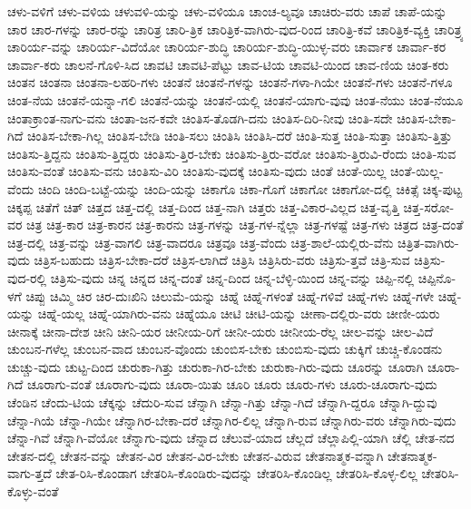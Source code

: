{ಚಳು-ವಳಿಗೆ
ಚಳು-ವಳಿಯ
ಚಳುವಳಿ-ಯನ್ನು
ಚಳು-ವಳಿಯೂ
ಚಾಂಚ-ಲ್ಯವೂ
ಚಾಚಿರು-ವರು
ಚಾಪೆ
ಚಾಪೆ-ಯನ್ನು
ಚಾರ
ಚಾರ-ಗಳನ್ನು
ಚಾರ-ರನ್ನು
ಚಾರಿತ್ರ
ಚಾರಿ-ತ್ರಿಕ
ಚಾರಿತ್ರಿಕ-ವಾಗಿರು-ವುದ-ರಿಂದ
ಚಾರಿತ್ರಿ-ಕವೆ
ಚಾರಿತ್ರಿಕ-ವ್ಯಕ್ತಿ
ಚಾರಿತ್ರ್ಯ
ಚಾರಿರ್ಯ-ವನ್ನು
ಚಾರಿರ್ಯ-ವಿದೆಯೋ
ಚಾರಿರ್ಯ-ಶುದ್ಧಿ
ಚಾರಿರ್ಯ-ಶುದ್ಧಿ-ಯುಳ್ಳ-ವರು
ಚಾರ್ವಾಕ
ಚಾರ್ವಾ-ಕರ
ಚಾರ್ವಾ-ಕರು
ಚಾಲನೆ-ಗೊಳಿ-ಸಿದ
ಚಾವಟಿ
ಚಾವಟಿ-ಪೆಟ್ಟು
ಚಾವ-ಟಿಯ
ಚಾವಟಿ-ಯಿಂದ
ಚಾವ-ಣಿಯ
ಚಿಂತ-ಕರು
ಚಿಂತನ
ಚಿಂತನಾ
ಚಿಂತನಾ-ಲಹರಿ-ಗಳು
ಚಿಂತನೆ
ಚಿಂತನೆ-ಗಳನ್ನು
ಚಿಂತನೆ-ಗಳಾ-ಗಿಯೇ
ಚಿಂತನೆ-ಗಳು
ಚಿಂತನೆ-ಗಳೂ
ಚಿಂತ-ನೆಯ
ಚಿಂತನೆ-ಯನ್ನಾ-ಗಲಿ
ಚಿಂತನೆ-ಯನ್ನು
ಚಿಂತನೆ-ಯಲ್ಲಿ
ಚಿಂತನೆ-ಯಾಗು-ವುವು
ಚಿಂತ-ನೆಯು
ಚಿಂತ-ನೆಯೂ
ಚಿಂತಾಕ್ರಾಂತ-ನಾಗು-ವನು
ಚಿಂತಾ-ಜನ-ಕವೇ
ಚಿಂತಿಸ-ತೊಡಗಿ-ದನು
ಚಿಂತಿಸ-ದಿರಿ-ನೀವು
ಚಿಂತಿ-ಸದೇ
ಚಿಂತಿಸ-ಬೇಕಾ-ಗಿದೆ
ಚಿಂತಿಸ-ಬೇಕಾ-ಗಿಲ್ಲ
ಚಿಂತಿಸ-ಬೇಡಿ
ಚಿಂತಿ-ಸಲು
ಚಿಂತಿಸಿ
ಚಿಂತಿಸಿ-ದರೆ
ಚಿಂತಿ-ಸುತ್ತ
ಚಿಂತಿ-ಸುತ್ತಾ
ಚಿಂತಿಸು-ತ್ತಿತ್ತು
ಚಿಂತಿಸು-ತ್ತಿದ್ದನು
ಚಿಂತಿಸು-ತ್ತಿದ್ದರು
ಚಿಂತಿಸು-ತ್ತಿರ-ಬೇಕು
ಚಿಂತಿಸು-ತ್ತಿರು-ವರೋ
ಚಿಂತಿಸು-ತ್ತಿರುವಿ-ರೆಂದು
ಚಿಂತಿ-ಸುವ
ಚಿಂತಿಸು-ವಂತೆ
ಚಿಂತಿಸು-ವನು
ಚಿಂತಿಸು-ವಿರಿ
ಚಿಂತಿಸು-ವುದಕ್ಕೆ
ಚಿಂತಿಸು-ವುದು
ಚಿಂತೆ
ಚಿಂತೆ-ಯಿಲ್ಲ
ಚಿಂತೆ-ಯಿಲ್ಲ-ವೆಂದು
ಚಿಂದಿ
ಚಿಂದಿ-ಬಟ್ಟೆ-ಯನ್ನು
ಚಿಂದಿ-ಯನ್ನು
ಚಿಕಾಗೊ
ಚಿಕಾ-ಗೊಗೆ
ಚಿಕಾಗೋ
ಚಿಕಾಗೋ-ದಲ್ಲಿ
ಚಿಕಿತ್ಸೆ
ಚಿಕ್ಕ-ಪುಟ್ಟ
ಚಿಕ್ಕಪ್ಪ
ಚಿತೆಗೆ
ಚಿತ್
ಚಿತ್ತದ
ಚಿತ್ತ-ದಲ್ಲಿ
ಚಿತ್ತ-ದಿಂದ
ಚಿತ್ತ-ನಾಗಿ
ಚಿತ್ತರು
ಚಿತ್ತ-ವಿಕಾರ-ವಿಲ್ಲದ
ಚಿತ್ತ-ವೃತ್ತಿ
ಚಿತ್ತ-ಸರೋ-ವರ
ಚಿತ್ರ
ಚಿತ್ರ-ಕಾರ
ಚಿತ್ರ-ಕಾರನ
ಚಿತ್ರ-ಕಾರನು
ಚಿತ್ರ-ಗಳನ್ನು
ಚಿತ್ರ-ಗಳ-ನ್ನೆಲ್ಲಾ
ಚಿತ್ರ-ಗಳಷ್ಟೆ
ಚಿತ್ರ-ಗಳು
ಚಿತ್ರದ
ಚಿತ್ರ-ದಂತೆ
ಚಿತ್ರ-ದಲ್ಲಿ
ಚಿತ್ರ-ವನ್ನು
ಚಿತ್ರ-ವಾಗಲಿ
ಚಿತ್ರ-ವಾದರೂ
ಚಿತ್ರವೂ
ಚಿತ್ರ-ವೆಂದು
ಚಿತ್ರ-ಶಾಲೆ-ಯಲ್ಲಿರು-ವೆನು
ಚಿತ್ರಿತ-ವಾಗಿರು-ವುದು
ಚಿತ್ರಿಸ-ಬಹುದು
ಚಿತ್ರಿಸ-ಬೇಕಾ-ದರೆ
ಚಿತ್ರಿಸ-ಲಾಗಿದೆ
ಚಿತ್ರಿಸಿ
ಚಿತ್ರಿಸಿರು-ವರು
ಚಿತ್ರಿಸು-ತ್ತವೆ
ಚಿತ್ರಿ-ಸುವ
ಚಿತ್ರಿಸು-ವುದ-ರಲ್ಲಿ
ಚಿತ್ರಿಸು-ವುದು
ಚಿನ್ನ
ಚಿನ್ನದ
ಚಿನ್ನ-ದಂತೆ
ಚಿನ್ನ-ದಿಂದ
ಚಿನ್ನ-ಬೆಳ್ಳಿ-ಯಿಂದ
ಚಿನ್ನ-ವನ್ನು
ಚಿಪ್ಪಿ-ನಲ್ಲಿ
ಚಿಪ್ಪಿನೊ-ಳಗೆ
ಚಿಪ್ಪು
ಚಿಮ್ಮಿ
ಚಿರ
ಚಿರ-ದುಃಖಿನಿ
ಚಿಲುಮೆ-ಯನ್ನು
ಚಿಹ್ನೆ
ಚಿಹ್ನೆ-ಗಳಂತೆ
ಚಿಹ್ನೆ-ಗಳಿವೆ
ಚಿಹ್ನೆ-ಗಳು
ಚಿಹ್ನೆ-ಗಳೇ
ಚಿಹ್ನೆ-ಯನ್ನು
ಚಿಹ್ನೆ-ಯಲ್ಲ
ಚಿಹ್ನೆ-ಯಾಗಿರು-ವನು
ಚಿಹ್ನೆಯೂ
ಚೀಟಿ
ಚೀಟಿ-ಯನ್ನು
ಚೀಣಾ-ದಲ್ಲಿರು-ವರು
ಚೀಣೀ-ಯರು
ಚೀನಾಕ್ಕೆ
ಚೀನಾ-ದೇಶ
ಚೀನಿ
ಚೀನಿ-ಯರ
ಚೀನೀಯ-ರಿಗೆ
ಚೀನೀ-ಯರು
ಚೀನೀಯ-ರೆಲ್ಲ
ಚೀಲ-ವನ್ನು
ಚೀಲ-ವಿದೆ
ಚುಂಬನ-ಗಳೆಲ್ಲ
ಚುಂಬನ-ವಾದ
ಚುಂಬನ-ವೊಂದು
ಚುಂಬಿಸ-ಬೇಕು
ಚುಂಬಿಸು-ವುದು
ಚುಕ್ಕಿಗೆ
ಚುಚ್ಚಿ-ಕೊಂಡನು
ಚುಚ್ಚು-ವುದು
ಚುಟ್ಟ-ದಿಂದ
ಚುರುಕಾ-ಗಿತ್ತು
ಚುರುಕಾ-ಗಿರ-ಬೇಕು
ಚುರುಕಾ-ಗಿರು-ವುದು
ಚೂರನ್ನು
ಚೂರಾಗಿ
ಚೂರಾ-ಗಿದೆ
ಚೂರಾಗು-ವಂತೆ
ಚೂರಾಗು-ವುದು
ಚೂರಾ-ಯಿತು
ಚೂರಿ
ಚೂರು
ಚೂರು-ಗಳು
ಚೂರು-ಚೂರಾಗು-ವುದು
ಚೆಂಡಿನ
ಚೆಂದು-ಟಿಯ
ಚೆಕ್ಕನ್ನು
ಚೆದುರಿ-ಸುವ
ಚೆನ್ನಾಗಿ
ಚೆನ್ನಾ-ಗಿತ್ತು
ಚೆನ್ನಾ-ಗಿದೆ
ಚೆನ್ನಾಗಿ-ದ್ದರೂ
ಚೆನ್ನಾಗಿ-ದ್ದುವು
ಚೆನ್ನಾ-ಗಿಯೆ
ಚೆನ್ನಾ-ಗಿಯೇ
ಚೆನ್ನಾಗಿರ-ಬೇಕಾ-ದರೆ
ಚೆನ್ನಾಗಿರ-ಲಿಲ್ಲ
ಚೆನ್ನಾಗಿ-ರುವ
ಚೆನ್ನಾಗಿರು-ವರು
ಚೆನ್ನಾಗಿರು-ವುದು
ಚೆನ್ನಾ-ಗಿವೆ
ಚೆನ್ನಾಗಿ-ವೆಯೋ
ಚೆನ್ನಾಗು-ವುದು
ಚೆನ್ನಾದ
ಚೆಲುವೆ-ಯಾದ
ಚೆಲ್ಲದೆ
ಚೆಲ್ಲಾಪಿಲ್ಲಿ-ಯಾಗಿ
ಚೆಲ್ಲಿ
ಚೇತ-ನದ
ಚೇತನ-ದಲ್ಲಿ
ಚೇತನ-ವನ್ನು
ಚೇತನ-ವಿರ
ಚೇತನ-ವಿರ-ಬೇಕು
ಚೇತನ-ವಿರುವ
ಚೇತನಾತ್ಮಕ-ವನ್ನಾಗಿ
ಚೇತನಾತ್ಮಕ-ವಾಗು-ತ್ತದೆ
ಚೇತ-ರಿಸಿ-ಕೊಂಡಾಗ
ಚೇತರಿಸಿ-ಕೊಂಡಿರು-ವುದನ್ನು
ಚೇತರಿಸಿ-ಕೊಂಡಿಲ್ಲ
ಚೇತರಿಸಿ-ಕೊಳ್ಳ-ಲಿಲ್ಲ
ಚೇತರಿಸಿ-ಕೊಳ್ಳು-ವಂತೆ
}
